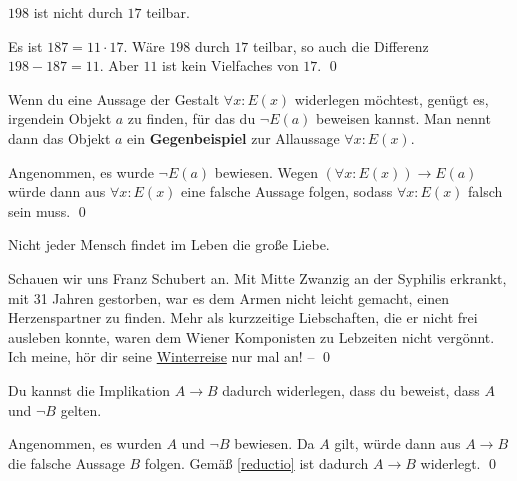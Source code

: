 \begin{bsp} \label{bsp:reductio}
    $198$ ist nicht durch $17$ teilbar.
\end{bsp}


\begin{bew}
    Es ist $187=11\cdot 17$. Wäre $198$ durch $17$ teilbar, so auch die Differenz $198-187 = 11$. Aber $11$ ist kein Vielfaches von $17$. \qed
\end{bew}


\begin{satz} \label{gegenbeispiel} 
    Wenn du eine Aussage der Gestalt $\forall x: E(x)$ widerlegen möchtest, genügt es, irgendein Objekt $a$ zu finden, für das du $\neg E(a)$ beweisen kannst. Man nennt dann das Objekt $a$ ein \textbf{Gegenbeispiel} zur Allaussage $\forall x: E(x)$.
\end{satz}


\begin{bew}
    Angenommen, es wurde $\neg E(a)$ bewiesen. Wegen $(\forall x: E(x)) \to E(a)$ würde dann aus $\forall x:E(x)$ eine falsche Aussage folgen, sodass $\forall x:E(x)$ falsch sein muss. \qed
\end{bew}

 
\begin{bsp}
    Nicht jeder Mensch findet im Leben die große Liebe.
\end{bsp}


\begin{bew}
    Schauen wir uns Franz Schubert an. Mit Mitte Zwanzig an der Syphilis erkrankt, mit 31 Jahren gestorben, war es dem Armen nicht leicht gemacht, einen Herzenspartner zu finden. Mehr als kurzzeitige Liebschaften, die er nicht frei ausleben konnte, waren dem Wiener Komponisten zu Lebzeiten nicht vergönnt. Ich meine, hör dir seine \href{https://youtu.be/F6I6Y1LhMKo?t=1665}{Winterreise} nur mal an! -- \qed
\end{bew}


\begin{satz}
    Du kannst die Implikation $A\to B$ dadurch widerlegen, dass du beweist, dass $A$ und $\neg B$ gelten.
\end{satz}


\begin{bew}
    Angenommen, es wurden $A$ und $\neg B$ bewiesen. Da $A$ gilt, würde dann aus $A\to B$ die falsche Aussage $B$ folgen. Gemäß \cref{reductio} ist dadurch $A\to B$ widerlegt. \qed
\end{bew}


